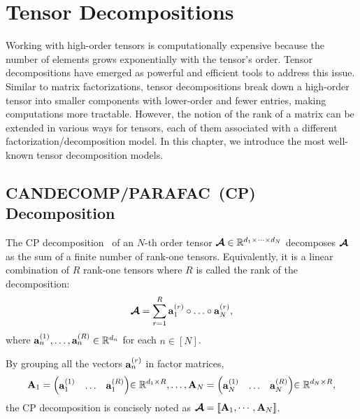 \section{Tensor Decompositions}\label{chapter:tensor-decomposition}
Working with high-order tensors is computationally expensive because the number of elements grows exponentially with the tensor's order. Tensor decompositions have emerged as powerful and efficient tools to address this issue.
Similar to matrix factorizations, tensor decompositions break down a high-order tensor into smaller components with lower-order and fewer entries, making computations more tractable. However, the notion of the rank of a matrix can be extended in various ways for tensors, each of them associated with a different factorization/decomposition model.
In this chapter, we introduce the most well-known tensor decomposition models.
\subsection{CANDECOMP/PARAFAC~(CP) Decomposition}\label{sec:cp-decomposition}
The CP decomposition~\citep{hitchcock1927expression} of an $N$-th order tensor $\bm{\mathcal{A}}\in\mathbb{R}^{d_1\times\cdots\times d_N}$  decomposes $\bm{\mathcal{A}}$ as the sum of a finite number of rank-one tensors. Equivalently, it is a linear combination of $R$ rank-one tensors where $R$ is called the  rank of the decomposition: 
$$\At = \sum_{r=1}^R \ab^{(r)}_1\outprod\dots\outprod\ab^{(r)}_N ,$$
where $\mathbf{a}^{(1)}_n,\dots,\mathbf{a}^{(R)}_n\in\mathbb{R}^{d_n}$ for each $n\in [N]$.

By grouping all the vectors $\mathbf{a}^{(r)}_n$ in factor matrices,
\[\mathbf{A}_1 = {\begin{pmatrix}
\mathbf{a}^{(1)}_1 & \dots & \mathbf{a}^{(R)}_1 \\
\end{pmatrix}}{\in\mathbb{R}^{d_1\times R}}, \dots ,\mathbf{A}_N = {\begin{pmatrix}
\mathbf{a}^{(1)}_N & \dots & \mathbf{a}^{(R)}_N \\
\end{pmatrix}}{\in\mathbb{R}^{d_N\times R}}, \]
the CP decomposition is concisely noted as $\bm{\mathcal{A}} = \llbracket \mathbf{A}_1,\cdots,\mathbf{A}_N \rrbracket$.

